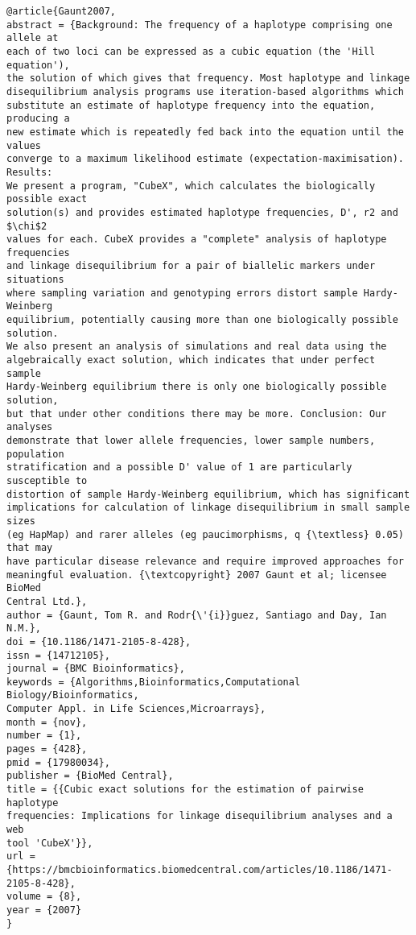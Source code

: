 \documentclass[]{article}
\begin{document}
\begin{verbatim}
@article{Gaunt2007,
abstract = {Background: The frequency of a haplotype comprising one allele at
each of two loci can be expressed as a cubic equation (the 'Hill equation'),
the solution of which gives that frequency. Most haplotype and linkage
disequilibrium analysis programs use iteration-based algorithms which
substitute an estimate of haplotype frequency into the equation, producing a
new estimate which is repeatedly fed back into the equation until the values
converge to a maximum likelihood estimate (expectation-maximisation). Results:
We present a program, "CubeX", which calculates the biologically possible exact
solution(s) and provides estimated haplotype frequencies, D', r2 and $\chi$2
values for each. CubeX provides a "complete" analysis of haplotype frequencies
and linkage disequilibrium for a pair of biallelic markers under situations
where sampling variation and genotyping errors distort sample Hardy-Weinberg
equilibrium, potentially causing more than one biologically possible solution.
We also present an analysis of simulations and real data using the
algebraically exact solution, which indicates that under perfect sample
Hardy-Weinberg equilibrium there is only one biologically possible solution,
but that under other conditions there may be more. Conclusion: Our analyses
demonstrate that lower allele frequencies, lower sample numbers, population
stratification and a possible D' value of 1 are particularly susceptible to
distortion of sample Hardy-Weinberg equilibrium, which has significant
implications for calculation of linkage disequilibrium in small sample sizes
(eg HapMap) and rarer alleles (eg paucimorphisms, q {\textless} 0.05) that may
have particular disease relevance and require improved approaches for
meaningful evaluation. {\textcopyright} 2007 Gaunt et al; licensee BioMed
Central Ltd.},
author = {Gaunt, Tom R. and Rodr{\'{i}}guez, Santiago and Day, Ian N.M.},
doi = {10.1186/1471-2105-8-428},
issn = {14712105},
journal = {BMC Bioinformatics},
keywords = {Algorithms,Bioinformatics,Computational Biology/Bioinformatics,
Computer Appl. in Life Sciences,Microarrays},
month = {nov},
number = {1},
pages = {428},
pmid = {17980034},
publisher = {BioMed Central},
title = {{Cubic exact solutions for the estimation of pairwise haplotype
frequencies: Implications for linkage disequilibrium analyses and a web
tool 'CubeX'}},
url =
{https://bmcbioinformatics.biomedcentral.com/articles/10.1186/1471-2105-8-428},
volume = {8},
year = {2007}
}
\end{verbatim}
\end{document}
